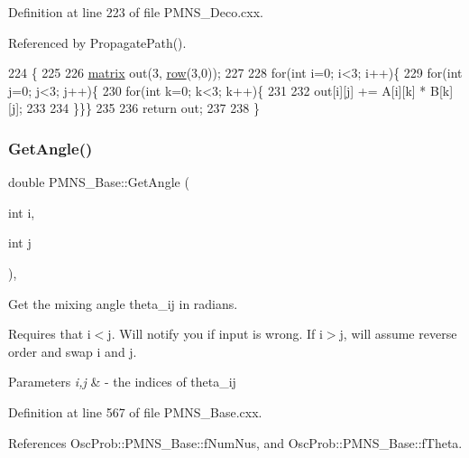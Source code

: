 Definition at line 223 of file P\+M\+N\+S\+\_\+\+Deco.\+cxx.



Referenced by Propagate\+Path().


\begin{DoxyCode}
224 \{
225 
226   \hyperlink{classOscProb_1_1PMNS__Deco_a77b4e0c041b6268910a270be0f5387c9}{matrix} out(3, \hyperlink{classOscProb_1_1PMNS__Deco_a34634741bc68bc1c524cf47f44e7f5b6}{row}(3,0));
227   
228   \textcolor{keywordflow}{for}(\textcolor{keywordtype}{int} i=0; i<3; i++)\{
229   \textcolor{keywordflow}{for}(\textcolor{keywordtype}{int} j=0; j<3; j++)\{
230   \textcolor{keywordflow}{for}(\textcolor{keywordtype}{int} k=0; k<3; k++)\{
231 
232     out[i][j] += A[i][k] * B[k][j];
233 
234   \}\}\}
235   
236   \textcolor{keywordflow}{return} out;
237 
238 \}
\end{DoxyCode}
\mbox{\label{classOscProb_1_1PMNS__Base_acee137091304c919642293ddf015bbc8}} 
\subsubsection{\texorpdfstring{Get\+Angle()}{GetAngle()}}
{\footnotesize\ttfamily double P\+M\+N\+S\+\_\+\+Base\+::\+Get\+Angle (\begin{DoxyParamCaption}\item[{int}]{i,  }\item[{int}]{j }\end{DoxyParamCaption})\hspace{0.3cm}{\ttfamily [virtual]}, {\ttfamily [inherited]}}

Get the mixing angle theta\+\_\+ij in radians.

Requires that i$<$j. Will notify you if input is wrong. If i$>$j, will assume reverse order and swap i and j.


\begin{DoxyParams}{Parameters}
{\em i,j} & -\/ the indices of theta\+\_\+ij \\
\hline
\end{DoxyParams}


Definition at line 567 of file P\+M\+N\+S\+\_\+\+Base.\+cxx.



References Osc\+Prob\+::\+P\+M\+N\+S\+\_\+\+Base\+::f\+Num\+Nus, and Osc\+Prob\+::\+P\+M\+N\+S\+\_\+\+Base\+::f\+Theta.


